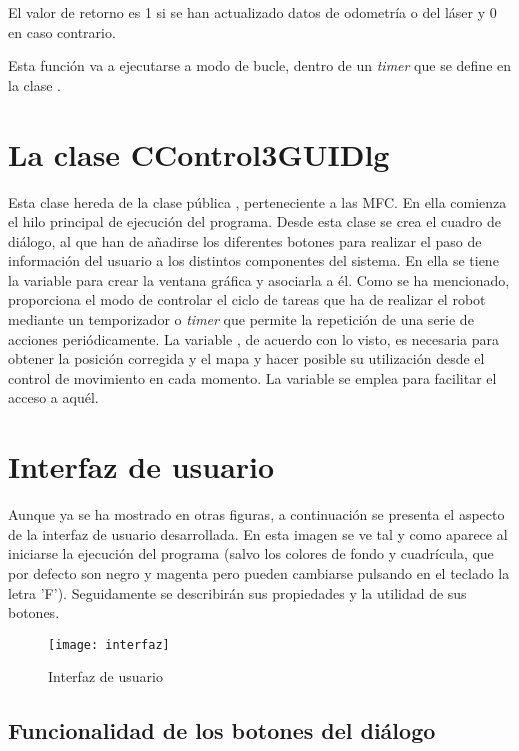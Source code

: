 El valor de retorno es 1 si se han actualizado datos de odometría o del láser y 0 en caso contrario.

Esta función va a ejecutarse a modo de bucle, dentro de un \emph{timer} que se define en la clase .

\section{La clase CControl3GUIDlg}
Esta clase hereda de la clase pública , perteneciente a las MFC. En ella comienza el hilo principal de ejecución del programa. Desde esta clase se crea el cuadro de diálogo, al que han de añadirse los diferentes botones para realizar el paso de información del usuario a los distintos componentes del sistema. En ella se tiene la variable  para crear la ventana gráfica y asociarla a él. Como se ha mencionado, proporciona el modo de controlar el ciclo de tareas que ha de realizar el robot mediante un temporizador o \emph{timer} que permite la repetición de una serie de acciones periódicamente. La variable , de acuerdo con lo visto, es necesaria para obtener la posición corregida y el mapa y hacer posible su utilización desde el control de movimiento en cada momento. La variable  se emplea para facilitar el acceso a aquél. %

\section{Interfaz de usuario}
Aunque ya se ha mostrado en otras figuras, a continuación se presenta el aspecto de la interfaz de usuario desarrollada. En esta imagen se ve tal y como aparece al iniciarse la ejecución del programa (salvo los colores de fondo y cuadrícula, que por defecto son negro y magenta pero pueden cambiarse pulsando en el teclado la letra 'F'). Seguidamente se describirán sus propiedades y la utilidad de sus botones.

\begin{figure}[h]
  \centering\texttt{[image: interfaz]}\\
  \caption{Interfaz de usuario}\label{fg:interfaz}
\end{figure}


\subsection{Funcionalidad de los botones del diálogo}

